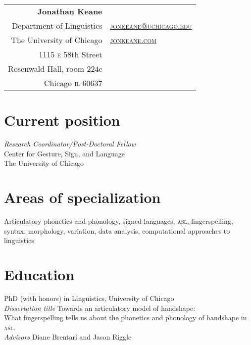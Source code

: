 \documentclass[10pt, letterpaper]{article}
\newcommand{\years}[1]{\marginpar{\scriptsize #1}}
\begin{document}
\thispagestyle{empty} %
\reversemarginpar
\raggedright

\begin{table}[!t]
  \begin{tabular*}{6.5in}{r|l}
    \hspace{3in}\textbf{\LARGE\sffamily Jonathan Keane}  &\\
Department of Linguistics & \href{mailto:jonkeane@uchicago.edu}{\textsc{jonkeane@uchicago.edu}}\\
  The University of Chicago & \href{http://jonkeane.com}{\textsc{jonkeane.com}}\\
1115 \textsc{e} 58th Street & \\
Rosenwald Hall, room 224c & \\
    Chicago \textsc{il} 60637 & \\
  \end{tabular*}
\end{table}
\setlength\parindent{0in}
\setlength\parskip{0ex}
\section*{Current position}
\emph{Research Coordinator/Post-Doctoral Fellow}\\ Center for Gesture, Sign, and Language\\ The University of Chicago\\

\section*{Areas of specialization}
Articulatory phonetics and phonology, signed languages, \textsc{asl}, fingerspelling, syntax, morphology, variation, data analysis, computational approaches to linguistics


\section*{Education}
\-\years{2014}PhD (with honors) in Linguistics, University of Chicago \\
\hspace{2em} \textit{Dissertation title} Towards an articulatory model of handshape:\\
\hspace{4em}What fingerspelling tells us about the phonetics and phonology of handshape in \textsc{asl}.\\
\hspace{2em} \textit{Advisors} Diane Brentari and Jason Riggle
\end{document}
